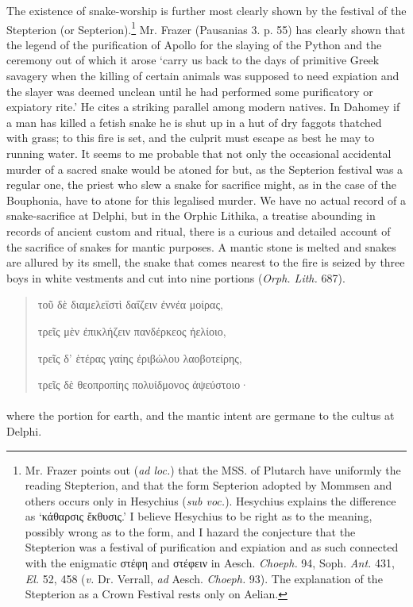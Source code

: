 \documentclass[a4paper, 11pt, oneside, polutonikogreek, english]{article}
\begin{document}
The existence of snake-worship is further most clearly shown by the festival of the Stepterion (or Septerion).\footnote{Mr. Frazer points out (\emph{ad loc.}) that the MSS. of Plutarch have uniformly the reading Stepterion, and that the form Septerion adopted by Mommsen and others occurs only in Hesychius (\emph{sub voc.}). Hesychius explains the difference as `κάθαρσις ἔκθυσις.' I believe Hesychius to be right as to the meaning, possibly wrong as to the form, and I hazard the conjecture that the Stepterion was a festival of purification and expiation and as such connected with the enigmatic στέφη and στέφειν in Aesch. \emph{Choeph.} 94, Soph. \emph{Ant.} 431, \emph{El.} 52, 458 (\emph{v.} Dr. Verrall, \emph{ad} Aesch. \emph{Choeph.} 93). The explanation of the Stepterion as a Crown Festival rests only on Aelian.} Mr. Frazer (Pausanias 3. p. 55) has clearly shown that the legend of the purification of Apollo for the slaying of the Python and the ceremony out of which it arose `carry us back to the days of primitive Greek savagery when the killing of certain animals was supposed to need expiation and the slayer was deemed unclean until he had performed some purificatory or expiatory rite.' He cites a striking parallel among modern natives. In Dahomey if a man has killed a fetish snake he is shut up in a hut of dry faggots thatched with grass; to this fire is set, and the culprit must escape as best he may to running water. It seems to me probable that not only the occasional accidental murder of a sacred snake would be atoned for but, as the Septerion festival was a regular one, the priest who slew a snake for sacrifice might, as in the case of the Bouphonia, have to atone for this legalised murder. We have no actual record of a snake-sacrifice at Delphi, but in the Orphic Lithika, a treatise abounding in records of ancient custom and ritual, there is a curious and detailed account of the sacrifice of snakes for mantic purposes. A mantic stone is melted and snakes are allured by its smell, the snake that comes nearest to the fire is seized by three boys in white vestments and cut into nine portions (\emph{Orph. Lith.} 687).
\begin{quotation}
\large
τοῦ δὲ διαμελεϊστὶ δαΐζειν ἐννέα μοίρας,

τρεῖς μὲν ἐπικλήζειν πανδέρκεος ἠελίοιο,

τρεῖς δ' ἑτέρας γαίης ἐριβώλου λαοβοτείρης,

τρεῖς δὲ θεοπροπίης πολυίδμονος ἀψεύστοιο·
\end{quotation}
\paragraph{}
where the portion for earth, and the mantic intent are germane to the cultus at Delphi.
\end{document}

